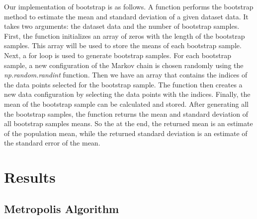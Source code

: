 \documentclass[%
reprint,
 amsmath,amssymb,
 aps,
]{revtex4-2}
\begin{document}
Our implementation of bootstrap is as follows. A function performs the bootstrap method to estimate the mean and standard deviation of a given dataset data. It takes two arguments: the dataset data and the number of bootstrap samples. First, the function initializes an array of zeros with the length of the bootstrap samples. This array will be used to store the means of each bootstrap sample. Next, a for loop is used to generate bootstrap samples. For each bootstrap sample, a new configuration of the Markov chain is chosen randomly using the \textit{np.random.randint} function. Then we have an array that contains the indices of the data points selected for the bootstrap sample. The function then creates a new data configuration by selecting the data points with the indices. Finally, the mean of the bootstrap sample can be calculated and stored. After generating all the bootstrap samples, the function returns the mean and standard deviation of all bootstrap samples means. So the at the end, the returned mean is an estimate of the population mean, while the returned standard deviation is an estimate of the standard error of the mean.

\section{Results}
\subsection{Metropolis Algorithm}
\end{document}
